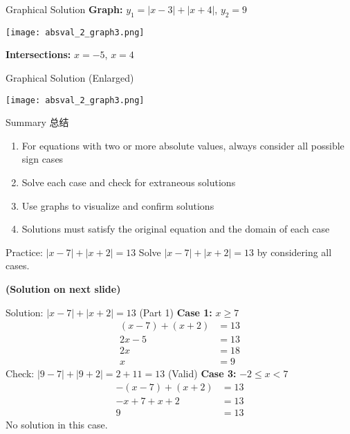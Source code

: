 \documentclass[aspectratio=169]{beamer}
\begin{document}
\begin{frame}{Graphical Solution}
    \footnotesize
    \textbf{Graph:} $y_1 = |x-3| + |x+4|$, $y_2 = 9$
    \begin{center}
        \texttt{[image: absval\_2\_graph3.png]}
    \end{center}
    \textbf{Intersections:} $x = -5$, $x = 4$
\end{frame}

\begin{frame}{Graphical Solution (Enlarged)}
    \begin{center}
        \texttt{[image: absval\_2\_graph3.png]}
    \end{center}
\end{frame}

\begin{frame}{Summary 总结}
    \begin{tcolorbox}[colback=lightgray,colframe=primary,title=Key Points 要点]
        \footnotesize
        \begin{enumerate}
            \item For equations with two or more absolute values, always consider all possible sign cases
            \item Solve each case and check for extraneous solutions
            \item Use graphs to visualize and confirm solutions
            \item Solutions must satisfy the original equation and the domain of each case
        \end{enumerate}
    \end{tcolorbox}
\end{frame}

\begin{frame}{Practice: $|x-7| + |x+2| = 13$}
    \footnotesize
    Solve $|x-7| + |x+2| = 13$ by considering all cases.\par
    \textbf{(Solution on next slide)}
\end{frame}

\begin{frame}{Solution: $|x-7| + |x+2| = 13$ (Part 1)}
    \footnotesize
    \textbf{Case 1:} $x \geq 7$
    \begin{align*}
        (x-7) + (x+2) &= 13 \\
        2x - 5 &= 13 \\
        2x &= 18 \\
        x &= 9
    \end{align*}
    Check: $|9-7| + |9+2| = 2 + 11 = 13$ (Valid)
    \vspace{1em}
    \textbf{Case 3:} $-2 \leq x < 7$
    \begin{align*}
        -(x-7) + (x+2) &= 13 \\
        -x+7+x+2 &= 13 \\
        9 &= 13
    \end{align*}
    No solution in this case.
\end{frame}
\end{document}
